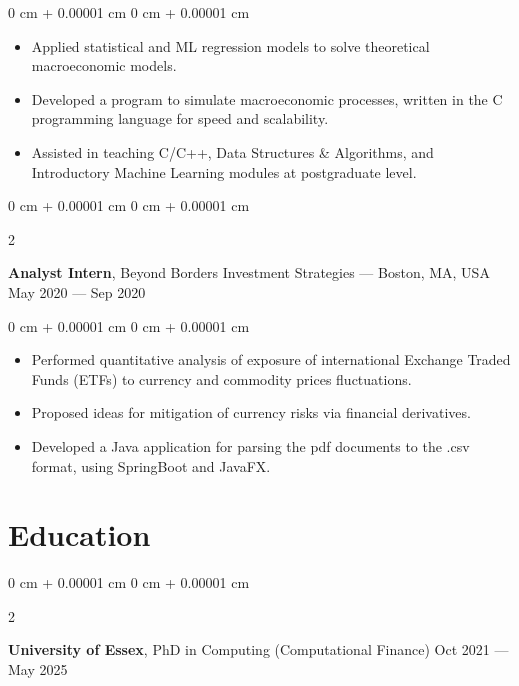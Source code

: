 \documentclass[10pt, letterpaper]{article}
\newenvironment{highlights}{
    \begin{itemize}[
        topsep=0.10 cm,
        parsep=0.10 cm,
        partopsep=0pt,
        itemsep=0pt,
        leftmargin=0 cm + 10pt
    ]
}{
    \end{itemize}
} %
\newenvironment{onecolentry}{
    \begin{adjustwidth}{
        0 cm + 0.00001 cm
    }{
        0 cm + 0.00001 cm
    }
}{
    \end{adjustwidth}
} %
\newenvironment{twocolentry}[2][]{
    \onecolentry
    \def\secondColumn{#2}
    \setcolumnwidth{\fill, 4.5 cm}
    \begin{paracol}{2}
}{
    \switchcolumn \raggedleft \secondColumn
    \end{paracol}
    \endonecolentry
} %
\begin{document}
        \vspace{0.10 cm}
        \begin{onecolentry}
            \begin{highlights}
            \item Applied statistical and ML regression models to solve theoretical macroeconomic models.
                  \item Developed a program to simulate macroeconomic processes, written in the C programming language for speed and scalability.
                  \item Assisted in teaching C/C++, Data Structures \& Algorithms, and Introductory Machine Learning modules at postgraduate level.
            \end{highlights}
        \end{onecolentry}
    
        \vspace{0.2 cm}

        \begin{twocolentry}{
            May 2020 --- Sep 2020
        }
            \textbf{Analyst Intern}, Beyond Borders Investment Strategies --- Boston, MA, USA\end{twocolentry}

            \vspace{0.10 cm}
            \begin{onecolentry}
                \begin{highlights}
                \item Performed quantitative analysis of exposure of international Exchange Traded Funds (ETFs) to currency and commodity prices fluctuations.
                \item Proposed ideas for mitigation of currency risks via financial derivatives.
                \item Developed a Java application for parsing the pdf documents to the .csv format, using SpringBoot and JavaFX.
                \end{highlights}
            \end{onecolentry}


    \section{Education}

        \begin{twocolentry}{
            Oct 2021 --- May 2025
        }
        \textbf{University of Essex}, PhD in Computing (Computational Finance)\end{twocolentry}
\end{document}
